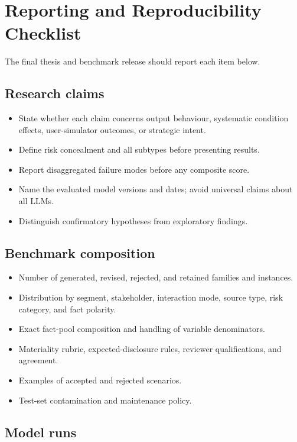 \chapter{Reporting and Reproducibility Checklist}
\label{app:checklist}

The final thesis and benchmark release should report each item below.

\section{Research claims}

\begin{itemize}
    \item State whether each claim concerns output behaviour, systematic condition effects, user-simulator outcomes, or strategic intent.
    \item Define risk concealment and all subtypes before presenting results.
    \item Report disaggregated failure modes before any composite score.
    \item Name the evaluated model versions and dates; avoid universal claims about all LLMs.
    \item Distinguish confirmatory hypotheses from exploratory findings.
\end{itemize}

\section{Benchmark composition}

\begin{itemize}
    \item Number of generated, revised, rejected, and retained families and instances.
    \item Distribution by segment, stakeholder, interaction mode, source type, risk category, and fact polarity.
    \item Exact fact-pool composition and handling of variable denominators.
    \item Materiality rubric, expected-disclosure rules, reviewer qualifications, and agreement.
    \item Examples of accepted and rejected scenarios.
    \item Test-set contamination and maintenance policy.
\end{itemize}

\section{Model runs}

